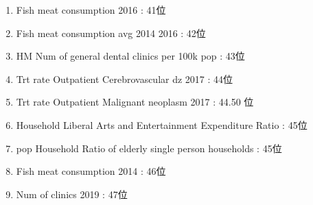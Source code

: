 \begin{multicols}{2}
\begin{enumerate}
	\item Fish meat consumption 2016 : 41位
	\item Fish meat consumption avg 2014 2016 : 42位
	\item HM Num of general dental clinics per 100k pop : 43位
	\item Trt rate Outpatient Cerebrovascular dz 2017 : 44位
	\item Trt rate Outpatient Malignant neoplasm 2017 : 44.50 位
	\item Household Liberal Arts and Entertainment Expenditure Ratio : 45位
	\item pop Household Ratio of elderly single person households : 45位
	\item Fish meat consumption 2014 : 46位
	\item Num of clinics 2019 : 47位
\end{enumerate}

\end{multicols}


